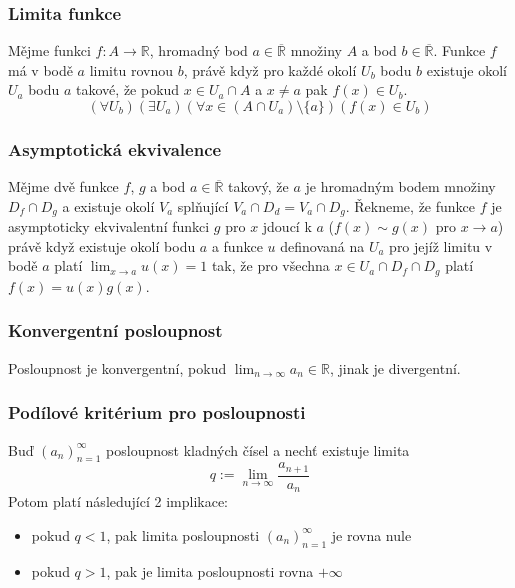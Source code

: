 \subsubsection*{Limita funkce}
Mějme funkci $f: A \rightarrow \mathbb{R}$, hromadný bod $a \in \overline{\mathbb{R}}$ množiny $A$ a bod $b \in \overline{\mathbb{R}}$. Funkce $f$ má v bodě $a$ limitu rovnou $b$, právě když pro každé okolí $U_b$ bodu $b$ existuje okolí $U_a$ bodu $a$ takové, že pokud $x \in U_a \cap A$ a $x \neq a$ pak $f(x) \in U_b$.
\[(\forall U_b)(\exists U_a)(\forall x \in (A \cap U_a) \setminus \{a\})(f(x) \in U_b)\]

\subsubsection*{Asymptotická ekvivalence}
Mějme dvě funkce $f$, $g$ a bod $a \in \overline{\mathbb{R}}$ takový, že $a$  je hromadným bodem množiny $D_f \cap D_g$ a existuje okolí $V_a$ splňující $V_a \cap D_d = V_a \cap D_g$. Řekneme, že funkce $f$ je asymptoticky ekvivalentní funkci $g$ pro $x$ jdoucí k $a$ ($f(x) \sim g(x) \text{ pro } x\to a$) právě když existuje okolí bodu $a$ a funkce $u$ definovaná na $U_a$ pro jejíž limitu v bodě $a$ platí $\lim_{x\to a} u(x) = 1$ tak, že pro všechna $x \in U_a \cap D_f \cap D_g$ platí $f(x) = u(x)g(x)$.

\subsubsection*{Konvergentní posloupnost}
Posloupnost je konvergentní, pokud $\lim_{n\to\infty} a_n \in \mathbb{R}$, jinak je divergentní.

\subsubsection*{Podílové kritérium pro posloupnosti}
Buď $(a_n)_{n=1}^{\infty}$ posloupnost kladných čísel a nechť existuje limita $$q:= \lim_{n\to\infty} \frac{a_{n+1}}{a_n} $$
Potom platí následující 2 implikace:
\begin{itemize}
	\item pokud $q < 1$, pak limita posloupnosti $(a_n)_{n=1}^{\infty}$ je rovna nule
	\item  pokud $q>1$, pak je limita posloupnosti rovna $+\infty$
\end{itemize}

